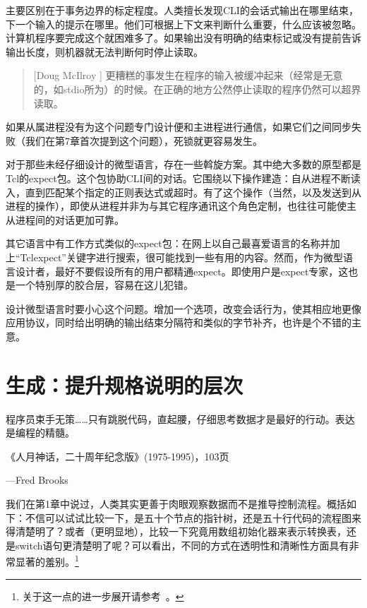 \documentclass[12pt,oneside]{ctexbook}
\begin{document}
\begin{common-format}
主要区别在于事务边界的标定程度。人类擅长发现CLI的会话式输出在哪里结束，下一个输入的提示在哪里。他们可根据上下文来判断什么重要，什么应该被忽略。计算机程序要完成这个就困难多了。如果输出没有明确的结束标记或没有提前告诉输出长度，则机器就无法判断何时停止读取。

\begin{quote}[Doug McIlroy 	]
更糟糕的事发生在程序的输入被缓冲起来（经常是无意的，如stdio所为）的时候。在正确的地方公然停止读取的程序仍然可以超界读取。
\end{quote}

如果从属进程没有为这个问题专门设计便和主进程进行通信，如果它们之间同步失败（我们在第7章首次提到这个问题），死锁就更容易发生。

对于那些未经仔细设计的微型语言，存在一些斡旋方案。其中绝大多数的原型都是Tcl的expect包。这个包协助CLI间的对话。它围绕以下操作建造：自从进程不断读入，直到匹配某个指定的正则表达式或超时。有了这个操作（当然，以及发送到从进程的操作），即使从进程并非为与其它程序通讯这个角色定制，也往往可能使主从进程间的对话更加可靠。

其它语言中有工作方式类似的expect包：在网上以自己最喜爱语言的名称并加上“Tclexpect”关键字进行搜索，很可能找到一些有用的内容。然而，作为微型语言设计者，最好不要假设所有的用户都精通expect。即使用户是expect专家，这也是一个特别厚的胶合层，容易在这儿犯错。

设计微型语言时要小心这个问题。增加一个选项，改变会话行为，使其相应地更像应用协议，同时给出明确的输出结束分隔符和类似的字节补齐，也许是个不错的主意。



\chapter{生成：提升规格说明的层次}
\begin{flushright}
\begin{notecard}{30em}
程序员束手无策……只有跳脱代码，直起腰，仔细思考数据才是最好的行动。表达是编程的精髓。

《人月神话，二十周年纪念版》(1975-1995)，103页

{\hfill —Fred Brooks}
\end{notecard}
\end{flushright}

我们在第1章中说过，人类其实更善于肉眼观察数据而不是推导控制流程。概括如下：不信可以试试比较一下，是五十个节点的指针树，还是五十行代码的流程图来得清楚明了？或者（更明显地），比较一下究竟用数组初始化器来表示转换表，还是switch语句更清楚明了呢？可以看出，不同的方式在透明性和清晰性方面具有非常显著的羞别。\footnote{关于这一点的进一步展开请参考~\cite{Bentley}。}


\end{common-format}
\end{document}
